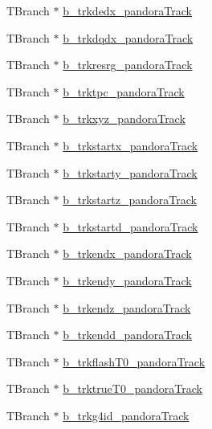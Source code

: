 \begin{DoxyCompactItemize}
\item 
T\-Branch $\ast$ \hyperlink{classanatree_a7602085679da71b3a746aef20d82f983}{b\-\_\-trkdedx\-\_\-pandora\-Track}
\item 
T\-Branch $\ast$ \hyperlink{classanatree_abe95194f0f763762a0748e568c2e9402}{b\-\_\-trkdqdx\-\_\-pandora\-Track}
\item 
T\-Branch $\ast$ \hyperlink{classanatree_a269b03fc1d1c98f519cf86eee5ebaa7c}{b\-\_\-trkresrg\-\_\-pandora\-Track}
\item 
T\-Branch $\ast$ \hyperlink{classanatree_a83931160f7d55dc1729d19d5596c08fb}{b\-\_\-trktpc\-\_\-pandora\-Track}
\item 
T\-Branch $\ast$ \hyperlink{classanatree_a98b79dd72d2573cba9d87a9daae04561}{b\-\_\-trkxyz\-\_\-pandora\-Track}
\item 
T\-Branch $\ast$ \hyperlink{classanatree_ad3eb8dbe08bba1dc6c62ea7f0ecef222}{b\-\_\-trkstartx\-\_\-pandora\-Track}
\item 
T\-Branch $\ast$ \hyperlink{classanatree_a19283815da2847fee1d49872e9dd0a60}{b\-\_\-trkstarty\-\_\-pandora\-Track}
\item 
T\-Branch $\ast$ \hyperlink{classanatree_a1ba553abb98927982dac4b2f316971d3}{b\-\_\-trkstartz\-\_\-pandora\-Track}
\item 
T\-Branch $\ast$ \hyperlink{classanatree_a90eb713492fb0998f3508c75551dc4a6}{b\-\_\-trkstartd\-\_\-pandora\-Track}
\item 
T\-Branch $\ast$ \hyperlink{classanatree_a81358c3f976dfbcac81bf4353469f51f}{b\-\_\-trkendx\-\_\-pandora\-Track}
\item 
T\-Branch $\ast$ \hyperlink{classanatree_a153146777e062e05d088d634539342bb}{b\-\_\-trkendy\-\_\-pandora\-Track}
\item 
T\-Branch $\ast$ \hyperlink{classanatree_aba3d549c8f465fdb833a9b4887c3bc9d}{b\-\_\-trkendz\-\_\-pandora\-Track}
\item 
T\-Branch $\ast$ \hyperlink{classanatree_a1a62de7d92d5912ee306b6e4bf6938e7}{b\-\_\-trkendd\-\_\-pandora\-Track}
\item 
T\-Branch $\ast$ \hyperlink{classanatree_ae14f0aeac6cc6f497b5d59fe737dd838}{b\-\_\-trkflash\-T0\-\_\-pandora\-Track}
\item 
T\-Branch $\ast$ \hyperlink{classanatree_ae60d3999569dcc77d635c262660aedad}{b\-\_\-trktrue\-T0\-\_\-pandora\-Track}
\item 
T\-Branch $\ast$ \hyperlink{classanatree_a3f806decdafb50f40f04e32e7d280f5b}{b\-\_\-trkg4id\-\_\-pandora\-Track}
\item 

\end{DoxyCompactItemize}
